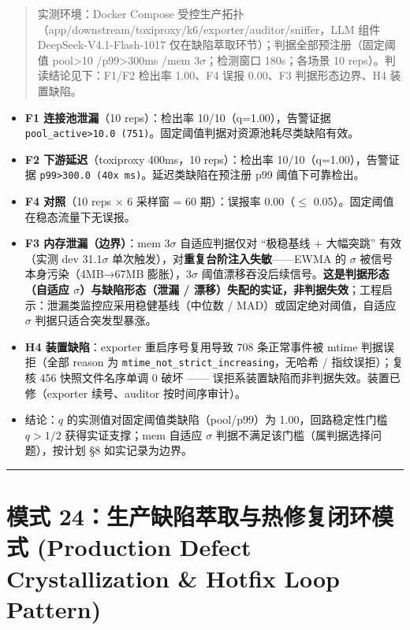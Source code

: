 \begin{quote}
实测环境：Docker Compose
受控生产拓扑（app/downstream/toxiproxy/k6/exporter/auditor/sniffer，LLM
组件 DeepSeek-V4.1-Flash-1017
仅在缺陷萃取环节）；判据全部预注册（固定阈值 pool\textgreater10
/p99\textgreater300ms /mem 3\(\sigma\)；检测窗口 180s；各场景 10
reps）。判读结论见下：F1/F2 检出率 1.00、F4 误报 0.00、F3
判据形态边界、H4 装置缺陷。
\end{quote}

\begin{itemize}
\item
  \textbf{F1 连接池泄漏}（10 reps）：检出率 10/10（q=1.00），告警证据
  \texttt{pool\_active\textgreater{}10.0\ (751)}。固定阈值判据对资源池耗尽类缺陷有效。
\item
  \textbf{F2 下游延迟}（toxiproxy 400ms，10 reps）：检出率
  10/10（q=1.00），告警证据
  \texttt{p99\textgreater{}300.0\ (40x\ ms)}。延迟类缺陷在预注册 p99
  阈值下可靠检出。
\item
  \textbf{F4 对照}（10 reps × 6 采样窗 = 60 期）：误报率 0.00（\(\le\)
  0.05）。固定阈值在稳态流量下无误报。
\item
  \textbf{F3 内存泄漏（边界）}：mem 3\(\sigma\) 自适应判据仅对
  ``极稳基线 + 大幅突跳'' 有效（实测 dev 31.1\(\sigma\)
  单次触发），对\textbf{重复台阶注入失敏}------EWMA 的 \(\sigma\)
  被信号本身污染（4MB→67MB 膨胀），3\(\sigma\)
  阈值漂移吞没后续信号。\textbf{这是判据形态（自适应
  \(\sigma\)）与缺陷形态（泄漏 /
  漂移）失配的实证，非判据失效}；工程启示：泄漏类监控应采用稳健基线（中位数
  / MAD）或固定绝对阈值，自适应 \(\sigma\) 判据只适合突发型暴涨。
\item
  \textbf{H4 装置缺陷}：exporter 重启序号复用导致 708 条正常事件被 mtime
  判据误拒（全部 reason 为
  \texttt{mtime\_not\_strict\_increasing}，无哈希 / 指纹误拒）；复核 456
  快照文件名序单调 0 破坏 ------
  误拒系装置缺陷而非判据失效。装置已修（exporter 续号、auditor
  按时间序审计）。
\item
  结论：\(q\) 的实测值对固定阈值类缺陷（pool/p99）为
  1.00，回路稳定性门槛 \(q>1/2\) 获得实证支撑；mem 自适应 \(\sigma\)
  判据不满足该门槛（属判据选择问题），按计划 §8 如实记录为边界。
\end{itemize}

\begin{center}\rule{0.5\linewidth}{0.5pt}\end{center}

\section{模式 24：生产缺陷萃取与热修复闭环模式 (Production Defect
Crystallization \& Hotfix Loop
Pattern)}\label{ux6a21ux5f0f-24ux751fux4ea7ux7f3aux9677ux8403ux53d6ux4e0eux70edux4feeux590dux95edux73afux6a21ux5f0f-production-defect-crystallization-hotfix-loop-pattern}

